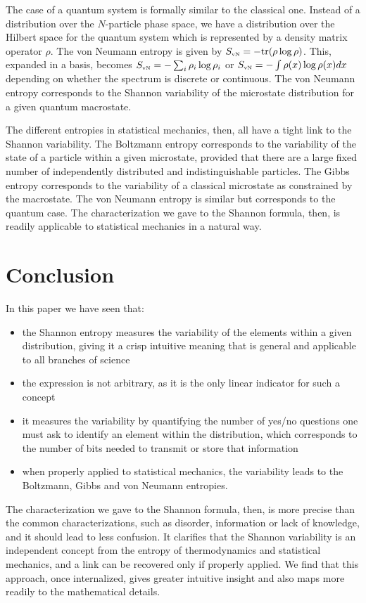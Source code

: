 \documentclass[iopart]{revtex4-1}
\begin{document}
The case of a quantum system is formally similar to the classical one. Instead of a distribution over the $N$-particle phase space, we have a distribution over the Hilbert space for the quantum system which is represented by a density matrix operator $\rho$. The von Neumann entropy is given by $S_\textrm{\tiny{vN}} = - \textrm{tr}(\rho \log \rho)$. This, expanded in a basis, becomes $S_\textrm{\tiny{vN}} = - \sum_i \rho_i \log \rho_i$ or $S_\textrm{\tiny{vN}} = - \int \rho(x) \log \rho(x)dx$ depending on whether the spectrum is discrete or continuous.  The von Neumann entropy corresponds to the Shannon variability of the microstate distribution for a given quantum macrostate.

The different entropies in statistical mechanics, then, all have a tight link to the Shannon variability. The Boltzmann entropy corresponds to the variability of the state of a particle within a given microstate, provided that there are a large fixed number of independently distributed and indistinguishable particles. The Gibbs entropy corresponds to the variability of a classical microstate as constrained by the macrostate. The von Neumann entropy is similar but corresponds to the quantum case. The characterization we gave to the Shannon formula, then, is readily applicable to statistical mechanics in a natural way. 

\section{Conclusion}

In this paper we have seen that:
\begin{itemize}
	\item the Shannon entropy measures the variability of the elements within a given distribution, giving it a crisp intuitive meaning that is general and applicable to all branches of science
	\item the expression is not arbitrary, as it is the only linear indicator for such a concept
	\item it measures the variability by quantifying the number of yes/no questions one must ask to identify an element within the distribution, which corresponds to the number of bits needed to transmit or store that information
	\item when properly applied to statistical mechanics, the variability leads to the Boltzmann, Gibbs and von Neumann entropies.
\end{itemize}
The characterization we gave to the Shannon formula, then, is more precise than the common characterizations, such as disorder, information or lack of knowledge, and it should lead to less confusion. It clarifies that the Shannon variability is an independent concept from the entropy of thermodynamics and statistical mechanics, and a link can be recovered only if properly applied. We find that this approach, once internalized, gives greater intuitive insight and also maps more readily to the mathematical details.

  

\end{document}
